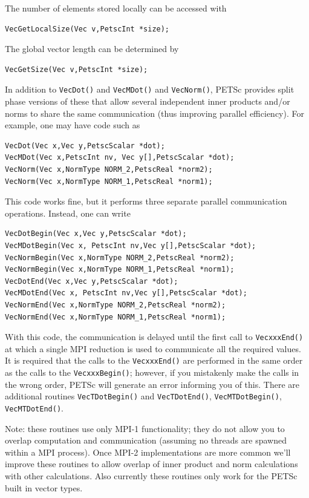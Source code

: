 The number of elements stored locally can be accessed with
\begin{lstlisting}
VecGetLocalSize(Vec v,PetscInt *size);
\end{lstlisting}
The global vector length can be determined by
\begin{lstlisting}
VecGetSize(Vec v,PetscInt *size);
\end{lstlisting}

In addition to \lstinline{VecDot()} and \lstinline{VecMDot()} and \lstinline{VecNorm()}, PETSc provides
split phase versions of these that allow several independent inner products and/or norms
to share the same communication (thus improving parallel efficiency). For example,
one may have code such as
\begin{lstlisting}
VecDot(Vec x,Vec y,PetscScalar *dot);
VecMDot(Vec x,PetscInt nv, Vec y[],PetscScalar *dot);
VecNorm(Vec x,NormType NORM_2,PetscReal *norm2);
VecNorm(Vec x,NormType NORM_1,PetscReal *norm1);
\end{lstlisting}
This code works fine, but it performs three separate parallel communication
operations. Instead, one can write
\begin{lstlisting}
VecDotBegin(Vec x,Vec y,PetscScalar *dot);
VecMDotBegin(Vec x, PetscInt nv,Vec y[],PetscScalar *dot);
VecNormBegin(Vec x,NormType NORM_2,PetscReal *norm2);
VecNormBegin(Vec x,NormType NORM_1,PetscReal *norm1);
VecDotEnd(Vec x,Vec y,PetscScalar *dot);
VecMDotEnd(Vec x, PetscInt nv,Vec y[],PetscScalar *dot);
VecNormEnd(Vec x,NormType NORM_2,PetscReal *norm2);
VecNormEnd(Vec x,NormType NORM_1,PetscReal *norm1);
\end{lstlisting}
With this code,
the communication is delayed until the first call to
\lstinline{VecxxxEnd()} at which
a single MPI reduction is used to communicate all the required values. It is required that the
calls to the \lstinline{VecxxxEnd()} are performed in the same order as the calls to the
\lstinline{VecxxxBegin()}; however, if you mistakenly make the calls in the wrong order, PETSc
will generate an error
informing you of this. There are additional routines \lstinline{VecTDotBegin()} and
\lstinline{VecTDotEnd()}, \lstinline{VecMTDotBegin()}, \lstinline{VecMTDotEnd()}.

Note: these routines use only MPI-1 functionality; they do not allow you to overlap
computation and communication (assuming no threads are spawned within a MPI process).
Once MPI-2 implementations are more common we'll improve these
routines to allow overlap of inner product and norm calculations with other calculations.
Also currently these routines only work for the PETSc built in vector types.

